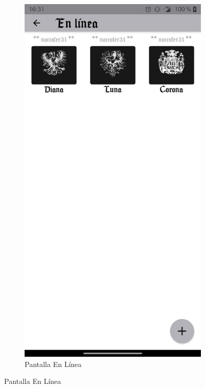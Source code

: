   \begin{figure}[H]
    \centering
    \begin{subfigure}[b]{0.45\linewidth}
      \includegraphics[width=\linewidth]{images/man8.jpeg}
      \caption{Pantalla En Línea}
      \label{fig:man1-8}

\end{subfigure}
\end{figure}
